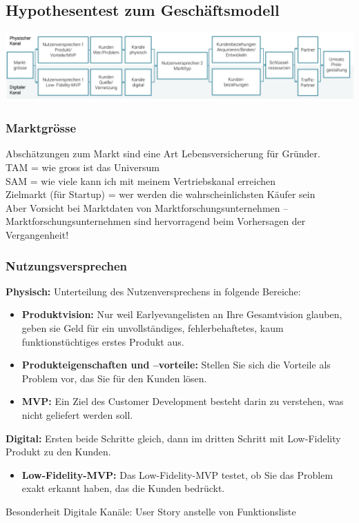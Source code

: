 \subsection{Hypothesentest zum Geschäftsmodell}
\includegraphics[width=1\linewidth]{images/customer_discovery_phase}

\subsubsection{Marktgrösse}
Abschätzungen zum Markt sind eine Art Lebensversicherung für Gründer. \\
TAM = wie gross ist das Universum \\
SAM = wie viele kann ich mit meinem Vertriebskanal erreichen \\
Zielmarkt (für Startup) = wer werden die wahrscheinlichsten Käufer sein \\
Aber Vorsicht bei Marktdaten von Marktforschungsunternehmen -- Marktforschungsunternehmen sind hervorragend beim Vorhersagen der Vergangenheit!

\subsubsection{Nutzungsversprechen}
\textbf{Physisch:} Unterteilung des Nutzenversprechens in folgende Bereiche:
\begin{itemize}
	\item \textbf{Produktvision:} Nur weil Earlyevangelisten an Ihre Gesamtvision glauben, geben sie Geld für ein unvollständiges, fehlerbehaftetes, kaum funktionstüchtiges erstes Produkt aus.
	\item \textbf{Produkteigenschaften und –vorteile:} Stellen Sie sich die Vorteile als Problem vor, das Sie für den Kunden lösen.
	\item \textbf{MVP:} Ein Ziel des Customer Development besteht darin zu verstehen, was nicht geliefert werden soll.
\end{itemize}
\textbf{Digital:} Ersten beide Schritte gleich, dann im dritten Schritt mit Low-Fidelity Produkt zu den Kunden.
\begin{itemize}
	\item \textbf{Low-Fidelity-MVP:} Das Low-Fidelity-MVP testet, ob Sie das Problem exakt erkannt haben, das die Kunden bedrückt.
\end{itemize}
Besonderheit Digitale Kanäle: User Story anstelle von Funktionsliste

